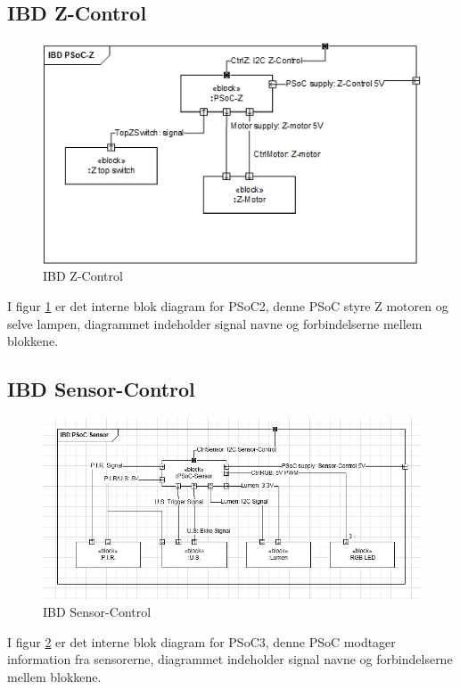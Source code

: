 \subsection{IBD Z-Control}
\begin{figure}[H] \centering
    \includegraphics[width=\textwidth]{0_Filer/Figuer/5_HW_Design/IBD_PSoC2_Z_vers3.png}
    \caption{IBD Z-Control}
    \label{fig:ibdZ}
\end{figure}
I figur \ref{fig:ibdZ} er det interne blok diagram for PSoC2, denne PSoC styre Z motoren og selve lampen, diagrammet indeholder signal navne og forbindelserne mellem blokkene.

\subsection{IBD Sensor-Control}
\begin{figure}[H] \centering
    \includegraphics[width=\textwidth]{0_Filer/Figuer/5_HW_Design/IBD_sensor_vers3.png}
    \caption{IBD Sensor-Control}
    \label{fig:ibdSensor}
\end{figure}
I figur \ref{fig:ibdSensor} er det interne blok diagram for PSoC3, denne PSoC modtager information fra sensorerne, diagrammet indeholder signal navne og forbindelserne mellem blokkene.



